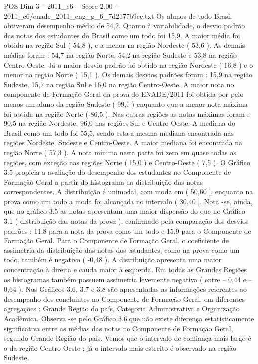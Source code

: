 \begin{textsample}{POS Dim 3 – 2011\_c6 – Score 2.00 – 2011\_c6/enade\_2011\_eng\_g\_6\_7d2177b9ec.txt}
Os alunos de todo Brasil obtiveram desempenho médio de 54,2.
Quanto à variabilidade, o desvio padrão das notas dos estudantes do Brasil como um todo foi 15,9.
A maior média foi obtida na região Sul ( 54,8 ), e a menor na região Nordeste ( 53,6 ).
As demais médias foram : 54,7 na região Norte, 54,2 na região Sudeste e 53,8 na região Centro-Oeste.
Já o maior desvio padrão foi obtido na região Nordeste ( 16,8 ) e o menor na região Norte ( 15,1 ).
Os demais desvios padrões foram : 15,9 na região Sudeste, 15,7 na região Sul e 16,0 na região Centro-Oeste.
A maior nota no componente de Formação Geral da prova do ENADE/2011 foi obtida por pelo menos um aluno da região Sudeste ( 99,0 ) enquanto que a menor nota máxima foi obtida na região Norte ( 86,5 ).
Nas outras regiões as notas máximas foram : 90,5 na região Nordeste, 96,0 nas regiões Sul e Centro-Oeste.
A mediana do Brasil como um todo foi 55,5, sendo esta a mesma mediana encontrada nas regiões Nordeste, Sudeste e Centro-Oeste.
A maior mediana foi encontrada na região Norte ( 57,3 ).
A nota mínima nesta parte foi zero em quase todas as regiões, com exceção nas regiões Norte ( 15,0 ) e Centro-Oeste ( 7,5 ).
O Gráfico 3.5 propicia a avaliação do desempenho dos estudantes no Componente de Formação Geral a partir do histograma da distribuição das notas correspondentes.
A distribuição é unimodal, com moda em ( 50,60 ], enquanto na prova como um todo a moda foi alcançada no intervalo ( 30,40 ].
Nota -se, ainda, que no gráfico 3.5 as notas apresentam uma maior dispersão do que no Gráfico 3.1 ( distribuição das notas da prova ), confirmado pela comparação dos desvios padrões : 11,8 para a nota da prova como um todo e 15,9 para o Componente de Formação Geral.
Para o Componente de Formação Geral, o coeficiente de assimetria da distribuição das notas dos estudantes, como na prova como um todo, também é negativo ( -0,48 ).
A distribuição apresenta uma maior concentração à direita e cauda maior à esquerda.
Em todas as Grandes Regiões os histogramas também possuem assimetria levemente negativa ( entre – 0,44 e – 0,64 ).
Nos Gráficos 3.6, 3.7 e 3.8 são apresentadas as informações referentes ao desempenho dos concluintes no Componente de Formação Geral, em diferentes agregações : Grande Região do país, Categoria Administrativa e Organização Acadêmica.
Observa -se pelo Gráfico 3.6 que não existe diferença estatisticamente significativa entre as médias das notas no Componente de Formação Geral, segundo Grande Região do país.
Vemos que o intervalo de confiança mais largo é o da região Centro-Oeste ; já o intervalo mais estreito é observado na região Sudeste.

\end{textsample}
